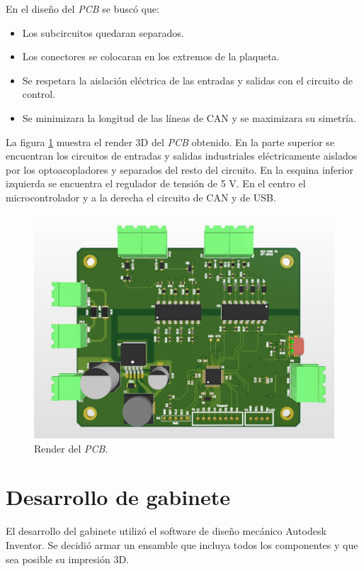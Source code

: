 En el diseño del \textit{PCB} se buscó que:
\begin{itemize}
	\item Los subcircuitos quedaran separados.
	\item Los conectores se colocaran en los extremos de la plaqueta.
	\item Se respetara la aislación eléctrica de las entradas y salidas con el circuito de control.
	\item Se minimizara la longitud de las líneas de CAN y se maximizara su simetría.
\end{itemize}

La figura \ref{fig:render_pcb} muestra el render 3D del \textit{PCB} obtenido. En la parte superior se encuentran los circuitos de entradas y salidas industriales eléctricamente aislados por los optoacopladores y separados del resto del circuito. En la esquina inferior izquierda se encuentra el regulador de tensión de 5 V. En el centro el microcontrolador y a la derecha el circuito de CAN y de USB.

\begin{figure}[htbp]
	\centering
	\includegraphics[scale=.4]{./Figures/pcb_sch.JPG}
	\caption{Render del \textit{PCB}.}
	\label{fig:render_pcb}
\end{figure}

\section{Desarrollo de gabinete}

El desarrollo del gabinete utilizó el software de diseño mecánico Autodesk Inventor\citep{web_inventor}. Se decidió armar un ensamble que incluya todos los componentes y que sea posible su impresión 3D.

